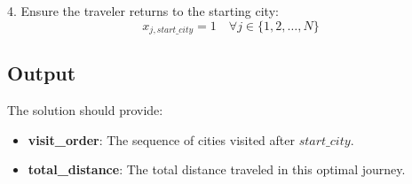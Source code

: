 \documentclass{article}
\begin{document}
4. Ensure the traveler returns to the starting city:
\[
x_{j, start\_city} = 1 \quad \forall j \in \{1, 2, \ldots, N\}
\]

\subsection*{Output}
The solution should provide:
\begin{itemize}
    \item \textbf{visit\_order}: The sequence of cities visited after $start\_city$.
    \item \textbf{total\_distance}: The total distance traveled in this optimal journey.
\end{itemize}
\end{document}
